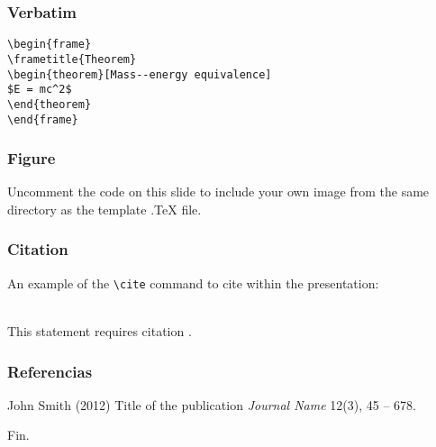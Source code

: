 \documentclass{beamer}
\begin{document}

\begin{frame}[fragile] %
\frametitle{Verbatim}
\begin{example}
\begin{verbatim}
\begin{frame}
\frametitle{Theorem}
\begin{theorem}[Mass--energy equivalence]
$E = mc^2$
\end{theorem}
\end{frame}\end{verbatim}
\end{example}
\end{frame}


\begin{frame}
\frametitle{Figure}
Uncomment the code on this slide to include your own image from the same directory as the template .TeX file.
\end{frame}


\begin{frame}[fragile] %
\frametitle{Citation}
An example of the \verb|\cite| command to cite within the presentation:\\~

This statement requires citation \cite{p1}.
\end{frame}


\begin{frame}
\frametitle{Referencias}
\footnotesize{
  \begin{thebibliography}{99} %
     John Smith (2012)
      \newblock Title of the publication
      \newblock \emph{Journal Name} 12(3), 45 -- 678.
  \end{thebibliography}
}
\end{frame}


\begin{frame}
\Huge{\centerline{Fin.}}
\end{frame}

\end{document}
